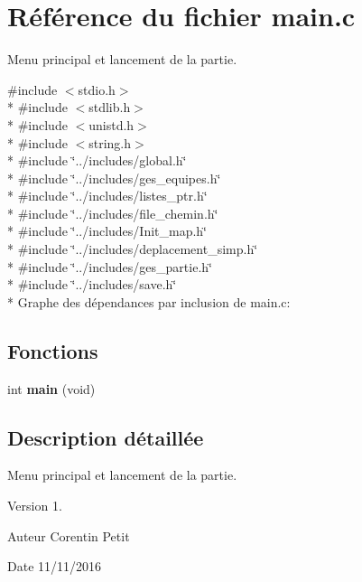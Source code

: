\hypertarget{a00027}{}\section{Référence du fichier main.\+c}
\label{a00027}


Menu principal et lancement de la partie.  


{\ttfamily \#include $<$stdio.\+h$>$}\\*
{\ttfamily \#include $<$stdlib.\+h$>$}\\*
{\ttfamily \#include $<$unistd.\+h$>$}\\*
{\ttfamily \#include $<$string.\+h$>$}\\*
{\ttfamily \#include \char`\"{}../includes/global.\+h\char`\"{}}\\*
{\ttfamily \#include \char`\"{}../includes/ges\+\_\+equipes.\+h\char`\"{}}\\*
{\ttfamily \#include \char`\"{}../includes/listes\+\_\+ptr.\+h\char`\"{}}\\*
{\ttfamily \#include \char`\"{}../includes/file\+\_\+chemin.\+h\char`\"{}}\\*
{\ttfamily \#include \char`\"{}../includes/\+Init\+\_\+map.\+h\char`\"{}}\\*
{\ttfamily \#include \char`\"{}../includes/deplacement\+\_\+simp.\+h\char`\"{}}\\*
{\ttfamily \#include \char`\"{}../includes/ges\+\_\+partie.\+h\char`\"{}}\\*
{\ttfamily \#include \char`\"{}../includes/save.\+h\char`\"{}}\\*
Graphe des dépendances par inclusion de main.\+c\+:
\subsection*{Fonctions}
\begin{DoxyCompactItemize}
\item 
int {\bfseries main} (void)\hypertarget{a00027_a840291bc02cba5474a4cb46a9b9566fe}{}\label{a00027_a840291bc02cba5474a4cb46a9b9566fe}

\end{DoxyCompactItemize}


\subsection{Description détaillée}
Menu principal et lancement de la partie. 

\begin{DoxyVersion}{Version}
1. 
\end{DoxyVersion}
\begin{DoxyAuthor}{Auteur}
Corentin Petit 
\end{DoxyAuthor}
\begin{DoxyDate}{Date}
11/11/2016 
\end{DoxyDate}
